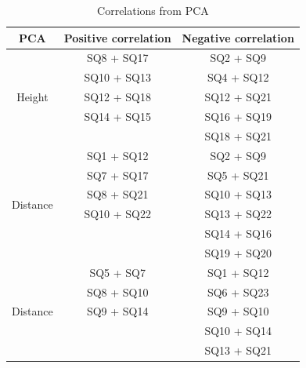 \begin{table}
	\centering
	\caption{Correlations from PCA}
	\label{tab:CorrelationsFromPCA} 
	\begin{tabular}{ c|c|c }
		\centering
		PCA & Positive correlation & Negative correlation \\ \hline
		\multirow{5}{*}{Height} & SQ8 + SQ17 & SQ2 + SQ9 \\
		& SQ10 + SQ13 & SQ4 + SQ12 \\
		& SQ12 + SQ18 & SQ12 + SQ21 \\
		& SQ14 + SQ15 & SQ16 + SQ19 \\
		&  & SQ18 + SQ21\\ \hline
		\multirow{6}{*}{Distance} & SQ1 + SQ12 & SQ2 + SQ9 \\
		& SQ7 + SQ17 & SQ5 + SQ21 \\
		& SQ8 + SQ21 & SQ10 + SQ13 \\
		& SQ10 + SQ22 & SQ13 + SQ22 \\
		&  & SQ14 + SQ16 \\	
		&  & SQ19 + SQ20 \\ \hline	
		\multirow{5}{*}{Distance} & SQ5 + SQ7 & SQ1 + SQ12 \\
		& SQ8 + SQ10 & SQ6 + SQ23 \\
		& SQ9 + SQ14 & SQ9 + SQ10 \\
		&  & SQ10 + SQ14 \\
		&  & SQ13 + SQ21 
	\end{tabular}        
\end{table}
\noindent
%

